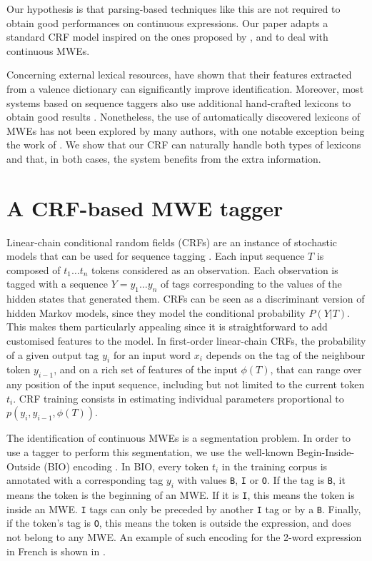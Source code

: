 \documentclass[output=paper,
modfonts
]{langscibook}
\begin{document}
Our hypothesis is that parsing-based techniques like this are not required to obtain good performances on continuous expressions. Our paper adapts a standard CRF model inspired on the ones proposed by \citet{constant-sigogne:2011:MWE}, \citet{riedl-biemann:2016:MWE} and \citet{shigeto-EtAl:2013:MWE} to deal with continuous MWEs. 

Concerning external lexical resources, \citet{nasr:acl:2015} have shown that their features extracted from a valence dictionary can significantly improve identification. Moreover, most systems based on sequence taggers also use additional hand-crafted lexicons to obtain good results \citep{constant-sigogne:2011:MWE,Schneider14b}. Nonetheless, the use of automatically discovered lexicons of MWEs has not been explored by many authors, with one notable exception being the work of \citet{riedl-biemann:2016:MWE}. We show that our CRF can naturally handle both types of lexicons and that, in both cases, the system benefits from the extra information.

\section{A CRF-based MWE tagger}
\label{schol:sec:crf}


Linear-chain conditional random fields (CRFs) are an instance of stochastic models that can be used for sequence tagging \citep{Lafferty2001}. 
Each input sequence $T$ is composed of $t_1 \ldots t_n$ tokens considered as an observation.
Each observation is tagged with a sequence $Y=y_1\ldots y_n$ of tags corresponding to the values of the hidden states that generated them.
CRFs can be seen as a discriminant version of hidden Markov models, since they model the conditional probability $P(Y|T)$.
This makes them particularly appealing since it is straightforward to add customised features to the model.
In first-order linear-chain CRFs, the probability of a given output tag $y_i$ for an input word $x_i$ depends on the tag of the neighbour token $y_{i-1}$, and on a rich set of features of the input $\phi(T)$, that can range over any position of the input sequence, including but not limited to the current token $t_i$. CRF training consists in estimating individual parameters proportional to $p(y_i,y_{i-1},\phi(T))$.

The identification of continuous MWEs is a segmentation problem. In order to use a tagger to perform this segmentation, we use the well-known Begin-Inside-Outside (BIO) encoding \citep{W95-0107}. In BIO, every token $t_i$ in the training corpus is annotated with a corresponding tag $y_i$ with values \texttt{B}, \texttt{I} or \texttt{O}. If the tag is \texttt{B}, it means the token is the beginning of an MWE. If it is \texttt{I}, this means the token is inside an MWE. \texttt{I} tags can only be preceded by another \texttt{I} tag or by a \texttt{B}. Finally, if the token's tag is \texttt{O}, this means the token is outside the expression, and does not belong to any MWE. An example of such encoding for the 2-word expression  in French is shown in .
\end{document}
